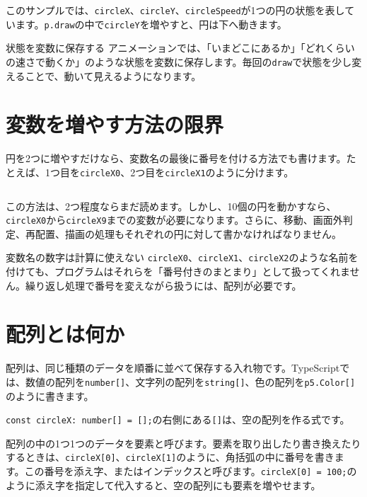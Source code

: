 このサンプルでは、\texttt{circleX}、\texttt{circleY}、\texttt{circleSpeed}が1つの円の状態を表しています。\texttt{p.draw}の中で\texttt{circleY}を増やすと、円は下へ動きます。

\begin{pointbox}{状態を変数に保存する}
アニメーションでは、「いまどこにあるか」「どれくらいの速さで動くか」のような状態を変数に保存します。毎回の\texttt{draw}で状態を少し変えることで、動いて見えるようになります。
\end{pointbox}

\section{変数を増やす方法の限界}

円を2つに増やすだけなら、変数名の最後に番号を付ける方法でも書けます。たとえば、1つ目を\texttt{circleX0}、2つ目を\texttt{circleX1}のように分けます。

\begin{listing}[htbp]
\inputminted{ts}{typescript-p5/listings/chapter10/two-circles-without-array.ts}
\caption{配列を使わずに2つの円を動かす（\texttt{chapter10/two-circles-without-array.ts}）}
\label{lst:chapter10-two-circles-without-array}
\end{listing}

この方法は、2つ程度ならまだ読めます。しかし、10個の円を動かすなら、\texttt{circleX0}から\texttt{circleX9}までの変数が必要になります。さらに、移動、画面外判定、再配置、描画の処理もそれぞれの円に対して書かなければなりません。

\begin{notebox}{変数名の数字は計算に使えない}
\texttt{circleX0}、\texttt{circleX1}、\texttt{circleX2}のような名前を付けても、プログラムはそれらを「番号付きのまとまり」として扱ってくれません。繰り返し処理で番号を変えながら扱うには、配列が必要です。
\end{notebox}

\section{配列とは何か}

配列は、同じ種類のデータを順番に並べて保存する入れ物です。TypeScriptでは、数値の配列を\texttt{number[]}、文字列の配列を\texttt{string[]}、色の配列を\texttt{p5.Color[]}のように書きます。

\texttt{const circleX: number[] = [];}の右側にある\texttt{[]}は、空の配列を作る式です。

配列の中の1つ1つのデータを要素と呼びます。要素を取り出したり書き換えたりするときは、\texttt{circleX[0]}、\texttt{circleX[1]}のように、角括弧の中に番号を書きます。この番号を添え字、またはインデックスと呼びます。\texttt{circleX[0] = 100;}のように添え字を指定して代入すると、空の配列にも要素を増やせます。

